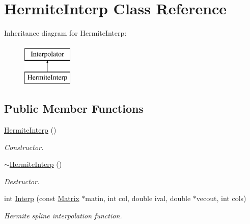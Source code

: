 \hypertarget{classHermiteInterp}{
\section{HermiteInterp Class Reference}
\label{dd/d1b/classHermiteInterp}
}
Inheritance diagram for HermiteInterp:\begin{figure}[H]
\begin{center}
\leavevmode
\includegraphics[height=2cm]{dd/d1b/classHermiteInterp}
\end{center}
\end{figure}
\subsection*{Public Member Functions}
\begin{DoxyCompactItemize}
\item 
\hypertarget{classHermiteInterp_a3c50ee042f7708addc2ac2afadbd5b1b}{
\hyperlink{classHermiteInterp_a3c50ee042f7708addc2ac2afadbd5b1b}{HermiteInterp} ()}
\label{dd/d1b/classHermiteInterp_a3c50ee042f7708addc2ac2afadbd5b1b}

\begin{DoxyCompactList}\small\item\em Constructor. \item\end{DoxyCompactList}\item 
\hypertarget{classHermiteInterp_a458bdb7a9130ec7b7f018babe15bf058}{
\hyperlink{classHermiteInterp_a458bdb7a9130ec7b7f018babe15bf058}{$\sim$HermiteInterp} ()}
\label{dd/d1b/classHermiteInterp_a458bdb7a9130ec7b7f018babe15bf058}

\begin{DoxyCompactList}\small\item\em Destructor. \item\end{DoxyCompactList}\item 
int \hyperlink{classHermiteInterp_a3de30c92f2e22b207a32b221d4a09ff9}{Interp} (const \hyperlink{classMatrix}{Matrix} $\ast$matin, int col, double ival, double $\ast$vecout, int cols)
\begin{DoxyCompactList}\small\item\em Hermite spline interpolation function. \item\end{DoxyCompactList}\end{DoxyCompactItemize}


